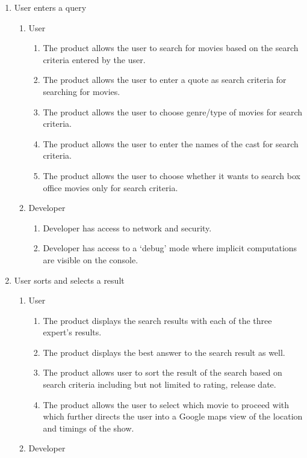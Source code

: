 \documentclass[]{article}
\begin{document}
\begin{enumerate}[{BE}1.]
	\item User enters a query
	\begin{enumerate}[{VP1}.1]
		\item User
			\begin{enumerate}
				\item The product allows the user to search for movies based on the search criteria entered by the user.
				\item The product allows the user to enter a quote as search criteria for searching for movies.
				\item The product allows the user to choose genre/type of movies for search criteria.
				\item The product allows the user to enter the names of the cast for search criteria.
				\item The product allows the user to choose whether it wants to search box office movies only for search criteria.
			\end{enumerate}
		\item Developer
			\begin{enumerate}
				\item Developer has access to network and security.
				\item Developer has access to a ‘debug’ mode where implicit computations are visible on the console.
			\end{enumerate}
	\end{enumerate}
	\item User sorts and selects a result
	\begin{enumerate}[{VP2}.1]
		\item User
			\begin{enumerate}
				\item The product displays the search results with each of the three expert’s results.
				\item The product displays the best answer to the search result as well.
				\item The product allows user to sort the result of the search based on search criteria including but not limited to rating, release date.
				\item The product allows the user to select which movie to proceed with which further directs the user into a Google maps view of the location and timings of the show.
			\end{enumerate}
		\item Developer
	\end{enumerate}

\end{enumerate}
\end{document}
